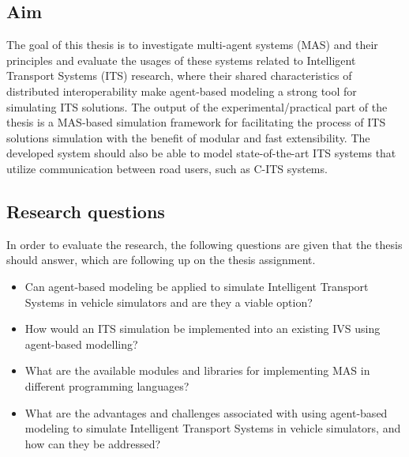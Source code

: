 \documentclass[titlepage, 12pt]{article}
\begin{document}
\subsection{Aim}

The goal of this thesis is to investigate multi-agent systems (MAS) and their principles and
evaluate the usages of these systems related to Intelligent Transport Systems (ITS) research,
where their shared characteristics of distributed interoperability make agent-based modeling a
strong tool for simulating ITS solutions. The output of the experimental/practical part of the
thesis is a MAS-based simulation framework for facilitating the process of ITS solutions
simulation with the benefit of modular and fast extensibility.  The developed system should
also be able to model state-of-the-art ITS systems that utilize communication between road
users, such as C-ITS systems. 

 \subsection{Research questions}

In order to evaluate the research, the following questions are given that the thesis should answer, which are following up on the thesis assignment. 


\begin{itemize}
    \item Can agent-based modeling be applied to simulate Intelligent Transport Systems in vehicle simulators and are they a viable option?
    \item How would an ITS simulation be implemented into an existing IVS using agent-based modelling?
    \item What are the available modules and libraries for implementing MAS in different programming languages?
    \item What are the advantages and challenges associated with using agent-based modeling to simulate Intelligent Transport Systems in vehicle simulators, and how can they be addressed?
\end{itemize}
\end{document}
